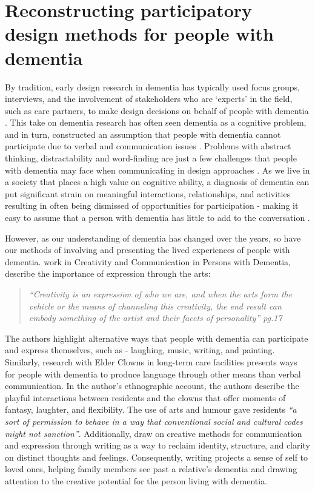 \section{Reconstructing participatory design methods for people with dementia}
\label{method:DementiaPD}
By tradition, early design research in dementia has typically used focus groups, interviews, and the involvement of stakeholders who are `experts’ in the field, such as care partners, to make design decisions on behalf of people with dementia \citep{branco_personalised_2017}. This take on dementia research has often seen dementia as a cognitive problem, and in turn, constructed an assumption that people with dementia cannot participate due to verbal and communication issues \citep{hwang2020exploring}. Problems with abstract thinking, distractability and word-finding are just a few challenges that people with dementia may face when communicating in design approaches \citep{banovic2018communication}. As we live in a society that places a high value on cognitive ability, a diagnosis of dementia can put significant strain on meaningful interactions, relationships, and activities resulting in often being dismissed of opportunities for participation - making it easy to assume that a person with dementia has little to add to the conversation \citep{bartlett2010broadening}.

However, as our understanding of dementia has changed over the years, so have our methods of involving and presenting the lived experiences of people with dementia. \cite{john_killick_claire_craig_creativity_2012} work in Creativity and Communication in Persons with Dementia, describe the importance of expression through the arts: 

\begin{quote}\textit{``Creativity is an expression of who we are, and when the arts form the vehicle or the means of channeling this creativity, the end result can embody something of the artist and their facets of personality'' \cite{john_killick_claire_craig_creativity_2012} pg.17}
\end{quote}

The authors highlight alternative ways that people with dementia can participate and express themselves, such as - laughing, music, writing, and painting. Similarly, \cite{kontos_presence_2015} research with Elder Clowns in long-term care facilities presents ways for people with dementia to produce language through other means than verbal communication. In the author's ethnographic account, the authors describe the playful interactions between residents and the clowns that offer moments of fantasy, laughter, and flexibility. The use of arts and humour gave residents \textit{``a sort of permission to behave in a way that conventional social and cultural codes might not sanction''}. Additionally, \cite{ryan_dementia_2009} draw on creative methods for communication and expression through writing as a way to reclaim identity, structure, and clarity on distinct thoughts and feelings. Consequently, writing projects a sense of self to loved ones, helping family members see past a relative's dementia and drawing attention to the creative potential for the person living with dementia. 

